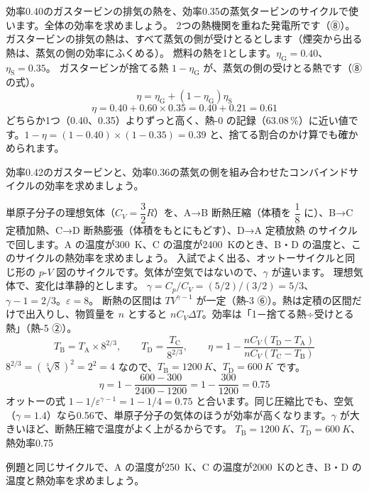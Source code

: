 \label{ph:熱-7:ex12}
\begin{phreidai}[コンバインドサイクルの効率]
効率0.40のガスタービンの排気の熱を、効率0.35の蒸気タービンのサイクルで使います。全体の効率を求めましょう。
\phbamen
2つの熱機関を重ねた発電所です（⑧）。
\phmushi
ガスタービンの排気の熱は、すべて蒸気の側が受けとるとします（煙突から出る熱は、蒸気の側の効率にふくめる）。
\phzu
燃料の熱を1とします。$\eta_{\mathrm G}=0.40$、$\eta_{\mathrm S}=0.35$。
\phriyu
ガスタービンが捨てる熱 $1-\eta_{\mathrm G}$ が、蒸気の側の受けとる熱です（⑧の式）。
\phtateru
\[\eta=\eta_{\mathrm G}+(1-\eta_{\mathrm G})\eta_{\mathrm S}\]
\phtoku
\[\eta=0.40+0.60\times0.35=0.40+0.21=0.61\]
\phtashikame
どちらか1つ（0.40、0.35）よりずっと高く、熱-0 の記録（63.08\,\%）に近い値です。$1-\eta=(1-0.40)\times(1-0.35)=0.39$ と、捨てる割合のかけ算でも確かめられます。
\end{phreidai}
\begin{jibun}
効率0.42のガスタービンと、効率0.36の蒸気の側を組み合わせたコンバインドサイクルの効率を求めましょう。
\end{jibun}

\label{ph:熱-7:ex13}
\begin{phreidai}
単原子分子の理想気体（$C_V=\dfrac{3}{2}R$）を、A→B 断熱圧縮（体積を $\dfrac{1}{8}$ に）、B→C 定積加熱、C→D 断熱膨張（体積をもとにもどす）、D→A 定積放熱 のサイクルで回します。A の温度が\qty{300}{K}、C の温度が\qty{2400}{K}のとき、B・D の温度と、このサイクルの熱効率を求めましょう。
\phbamen
入試でよく出る、オットーサイクルと同じ形の $p$-$V$ 図のサイクルです。気体が空気ではないので、$\gamma$ が違います。
\phmushi
理想気体で、変化は準静的とします。
\phzu
$\gamma=C_p/C_V=(5/2)/(3/2)=5/3$、$\gamma-1=2/3$。$\varepsilon=8$。
\phriyu
断熱の区間は $TV^{\gamma-1}$ が一定（熱-3 ⑥）。熱は定積の区間だけで出入りし、物質量を $n$ とすると $nC_V\Delta T$。効率は「1－捨てる熱÷受けとる熱」（熱-5 ②）。
\phtateru
\[T_{\mathrm B}=T_{\mathrm A}\times8^{2/3},\qquad T_{\mathrm D}=\frac{T_{\mathrm C}}{8^{2/3}},\qquad\eta=1-\frac{nC_V(T_{\mathrm D}-T_{\mathrm A})}{nC_V(T_{\mathrm C}-T_{\mathrm B})}\]
\phtoku
$8^{2/3}=(\sqrt[3]{8})^2=2^2=4$ なので、$T_{\mathrm B}=\qty{1200}{K}$、$T_{\mathrm D}=\qty{600}{K}$ です。
\[\eta=1-\frac{600-300}{2400-1200}=1-\frac{300}{1200}=0.75\]
\phtashikame
オットーの式 $1-1/\varepsilon^{\gamma-1}=1-1/4=0.75$ と合います。同じ圧縮比でも、空気（$\gamma=1.4$）なら0.56で、単原子分子の気体のほうが効率が高くなります。$\gamma$ が大きいほど、断熱圧縮で温度がよく上がるからです。
\kotae $T_{\mathrm B}=\qty{1200}{K}$、$T_{\mathrm D}=\qty{600}{K}$、熱効率0.75
\end{phreidai}
\begin{jibun}
例題と同じサイクルで、A の温度が\qty{250}{K}、C の温度が\qty{2000}{K}のとき、B・D の温度と熱効率を求めましょう。
\end{jibun}


